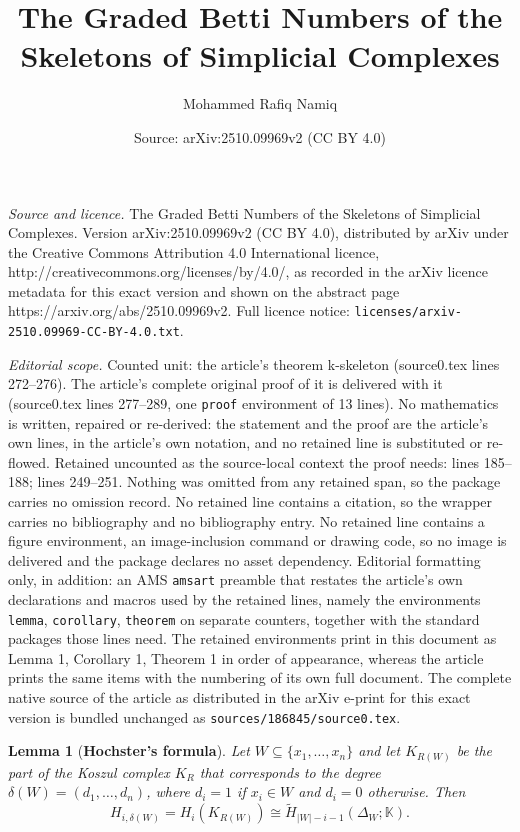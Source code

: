 \documentclass[10pt,a4paper]{amsart}
\title{The Graded Betti Numbers of the Skeletons of Simplicial Complexes}
\author{Mohammed Rafiq Namiq}
\date{Source: arXiv:2510.09969v2 (CC BY 4.0)}
\newtheorem{lemma}{Lemma}
\newcommand{\K}[0]{\mathbb{K}}
\begin{document}
\maketitle

\noindent\emph{Source and licence.} The Graded Betti Numbers of the Skeletons of Simplicial Complexes. Version arXiv:2510.09969v2 (CC BY 4.0), distributed by arXiv under the Creative Commons Attribution 4.0 International licence, http://creativecommons.org/licenses/by/4.0/, as recorded in the arXiv licence metadata for this exact version and shown on the abstract page https://arxiv.org/abs/2510.09969v2. Full licence notice: \texttt{licenses/arxiv-2510.09969-CC-BY-4.0.txt}.\par\smallskip

\noindent\textit{Editorial scope.} Counted unit: the article's theorem k-skeleton (source0.tex lines 272--276). The article's complete original proof of it is delivered with it (source0.tex lines 277--289, one \texttt{proof} environment of 13 lines). No mathematics is written, repaired or re-derived: the statement and the proof are the article's own lines, in the article's own notation, and no retained line is substituted or re-flowed.  Retained uncounted as the source-local context the proof needs: lines 185--188; lines 249--251.  Nothing was omitted from any retained span, so the package carries no omission record.  No retained line contains a citation, so the wrapper carries no bibliography and no bibliography entry.  No retained line contains a figure environment, an image-inclusion command or drawing code, so no image is delivered and the package declares no asset dependency.  Editorial formatting only, in addition: an AMS \texttt{amsart} preamble that restates the article's own declarations and macros used by the retained lines, namely the environments \texttt{lemma}, \texttt{corollary}, \texttt{theorem} on separate counters, together with the standard packages those lines need.  The retained environments print in this document as Lemma 1, Corollary 1, Theorem 1 in order of appearance, whereas the article prints the same items with the numbering of its own full document.  The complete native source of the article as distributed in the arXiv e-print for this exact version is bundled unchanged as \texttt{sources/186845/source0.tex}.
\begin{lemma}[\textbf{Hochster's formula}]\label{hochster}
	Let $W\subseteq\{x_1,\ldots,x_n\}$ and let $K_{R(W)}$ be the part of the Koszul complex $K_R$ that corresponds to the degree $\delta(W)=(d_1,\ldots,d_n)$, where $d_i=1$ if $x_i\in W$ and $d_i=0$ otherwise. Then 
	$$H_{i,\delta(W)}=H_i(K_{R(W)})\cong\tilde{H}_{|W|-i-1}(\Delta_W;\K).$$
\end{lemma}
\end{document}
